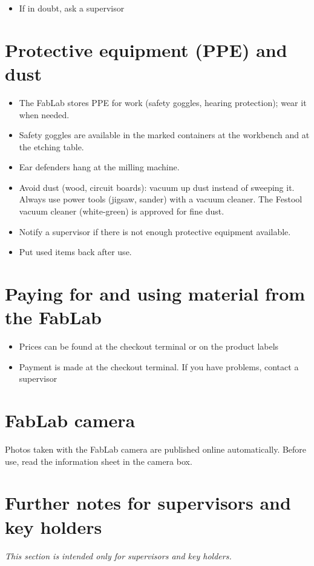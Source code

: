 \documentclass[13pt]{\basedir/fablab-document}
\begin{document}
\begin{itemize}
	\item If in doubt, ask a supervisor
\end{itemize}



\section{Protective equipment (PPE) and dust}
\begin{itemize}
	\item The FabLab stores PPE for work (safety goggles, hearing protection); wear it when needed.
	\item Safety goggles are available in the marked containers at the workbench and at the etching table.
	\item Ear defenders hang at the milling machine.
	\item Avoid dust (wood, circuit boards): vacuum up dust instead of sweeping it. Always use power tools (jigsaw, sander) with a vacuum cleaner. The Festool vacuum cleaner (white-green) is approved for fine dust.
	\item Notify a supervisor if there is not enough protective equipment available.
	\item Put used items back after use.
\end{itemize}



\section{Paying for and using material from the FabLab}
\begin{itemize}
	\item Prices can be found at the checkout terminal or on the product labels
	\item Payment is made at the checkout terminal. If you have problems, contact a supervisor
\end{itemize}

\section{FabLab camera}
Photos taken with the FabLab camera are published online automatically. Before use, read the information sheet in the camera box.

\newpage
\section{Further notes for supervisors and key holders}
\textit{This section is intended only for supervisors and key holders.}
\end{document}
